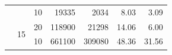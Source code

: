 \begin{table}[h]
\begin{tabular}{rrr|r|r|r|r|}
\multicolumn{1}{|r|}{}                    & \multicolumn{1}{r|}{}                    & 10                               & 19335                      & 2034                       & 8.03                       & 3.09                       \\ \cline{2-7} 
\multicolumn{1}{|r|}{}                    & \multicolumn{1}{r|}{\multirow{2}{*}{15}} & 20                               & 118900                     & 21298                      & 14.06                      & 6.00                       \\ \cline{3-7} 
\multicolumn{1}{|r|}{}                    & \multicolumn{1}{r|}{}                    & 10                               & 661100                     & 309080                     & 48.36                      & 31.56                      \\ \hline
\end{tabular}
\end{table}


